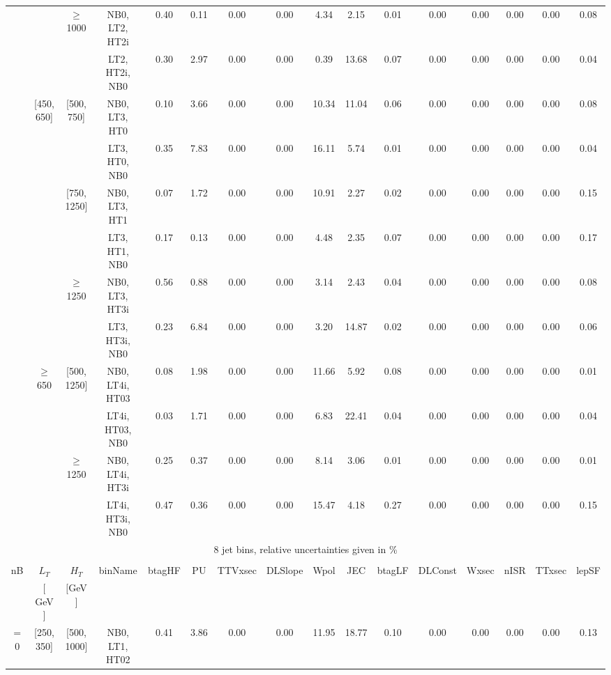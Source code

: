 \begin{sidewaystable}[ht]
\begin{center}
\begin{tabular}{|c | c | c | c | c | c | c | c | c | c | c | c | c | c | c | c | }
\cline{3-16}  & & $\geq$ 1000 &NB0, LT2, HT2i & 0.40 & 0.11 & 0.00 & 0.00 & 4.34 & 2.15 & 0.01 & 0.00 & 0.00 & 0.00 & 0.00 & 0.08 \\ 
  &  &  &LT2, HT2i, NB0 & 0.30 & 2.97 & 0.00 & 0.00 & 0.39 & 13.68 & 0.07 & 0.00 & 0.00 & 0.00 & 0.00 & 0.04 \\ 
\cline{2-16}   & [450, 650] & [500, 750]&NB0, LT3, HT0 & 0.10 & 3.66 & 0.00 & 0.00 & 10.34 & 11.04 & 0.06 & 0.00 & 0.00 & 0.00 & 0.00 & 0.08 \\ 
  &  &  &LT3, HT0, NB0 & 0.35 & 7.83 & 0.00 & 0.00 & 16.11 & 5.74 & 0.01 & 0.00 & 0.00 & 0.00 & 0.00 & 0.04 \\ 
\cline{3-16}  & & [750, 1250] &NB0, LT3, HT1 & 0.07 & 1.72 & 0.00 & 0.00 & 10.91 & 2.27 & 0.02 & 0.00 & 0.00 & 0.00 & 0.00 & 0.15 \\ 
  &  &  &LT3, HT1, NB0 & 0.17 & 0.13 & 0.00 & 0.00 & 4.48 & 2.35 & 0.07 & 0.00 & 0.00 & 0.00 & 0.00 & 0.17 \\ 
\cline{3-16}  & & $\geq$ 1250 &NB0, LT3, HT3i & 0.56 & 0.88 & 0.00 & 0.00 & 3.14 & 2.43 & 0.04 & 0.00 & 0.00 & 0.00 & 0.00 & 0.08 \\ 
  &  &  &LT3, HT3i, NB0 & 0.23 & 6.84 & 0.00 & 0.00 & 3.20 & 14.87 & 0.02 & 0.00 & 0.00 & 0.00 & 0.00 & 0.06 \\ 
\cline{2-16}   & $\geq$ 650 & [500, 1250]&NB0, LT4i, HT03 & 0.08 & 1.98 & 0.00 & 0.00 & 11.66 & 5.92 & 0.08 & 0.00 & 0.00 & 0.00 & 0.00 & 0.01 \\ 
  &  &  &LT4i, HT03, NB0 & 0.03 & 1.71 & 0.00 & 0.00 & 6.83 & 22.41 & 0.04 & 0.00 & 0.00 & 0.00 & 0.00 & 0.04 \\ 
\cline{3-16}  & & $\geq$ 1250 &NB0, LT4i, HT3i & 0.25 & 0.37 & 0.00 & 0.00 & 8.14 & 3.06 & 0.01 & 0.00 & 0.00 & 0.00 & 0.00 & 0.01 \\ 
  &  &  &LT4i, HT3i, NB0 & 0.47 & 0.36 & 0.00 & 0.00 & 15.47 & 4.18 & 0.27 & 0.00 & 0.00 & 0.00 & 0.00 & 0.15 \\ 
 \hline 
\multicolumn{16}{|c|}{8 jet bins, relative uncertainties given in \%} \\ 
\multicolumn{16}{|c|}{} \\ \hline 
nB &  $L_T$ & $H_T$ & binName & btagHF & PU & TTVxsec & DLSlope & Wpol & JEC & btagLF & DLConst & Wxsec & nISR & TTxsec & lepSF  \\ 
   & $[$ GeV $]$  &  $[$GeV$]$  &  &  &  &  &  &  &  &  &  &  &  &  &   \\ \hline 
\cline{1-16} $=$ 0 & [250, 350] & [500, 1000]&NB0, LT1, HT02 & 0.41 & 3.86 & 0.00 & 0.00 & 11.95 & 18.77 & 0.10 & 0.00 & 0.00 & 0.00 & 0.00 & 0.13 \\ 

\end{tabular}
\end{center}
\end{sidewaystable}
